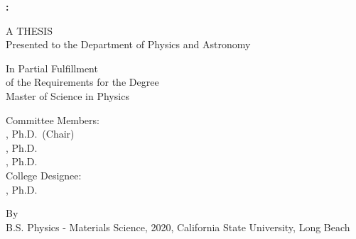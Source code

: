 \begin{titlepage}
\begin{center}
  
      \MakeUppercase{ \textbf{ \ttitle: \subttitle } }
      \vfill
        
A THESIS \\  \bigskip
Presented to the Department of Physics and Astronomy \\ \bigskip
\univname
        
        \vfill
        
        In Partial Fulfillment\\
        \bigskip
        of the Requirements for the Degree\\
        \bigskip
        Master of Science in Physics\\
        
        \vfill
        
        Committee Members:\\
        \bigskip
        \advisorname, Ph.D.~(Chair)\\
        \memberonename, Ph.D.\\
        \membertwoname, Ph.D.\\
        \bigskip
        College Designee:\\
        \bigskip
        \deptchairname, Ph.D.
        
        \vfill
        
        By \authorname \\
        \bigskip
        B.S. Physics - Materials Science, 2020, California State University, Long Beach\\
        \bigskip
        \thesisdate
		
    \end{center}
\end{titlepage}
